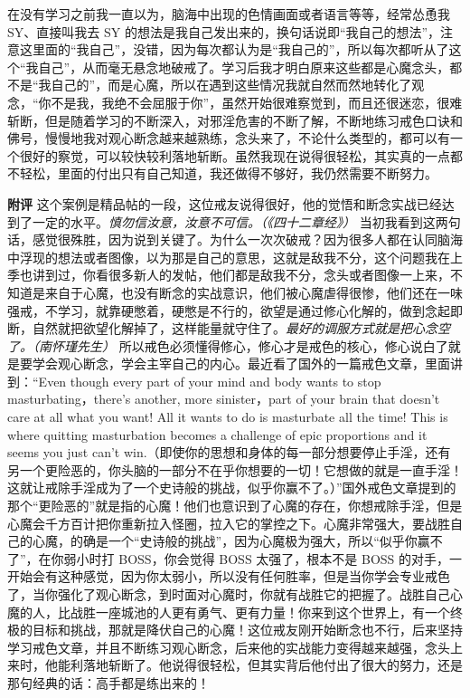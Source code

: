 \begin{case}
    在没有学习之前我一直以为，脑海中出现的色情画面或者语言等等，经常怂恿我 SY、直接叫我去 SY 的想法是我自己发出来的，换句话说即“我自己的想法”，注意这里面的“我自己”，没错，因为每次都认为是“我自己的”，所以每次都听从了这个“我自己”，从而毫无悬念地破戒了。学习后我才明白原来这些都是心魔念头，都不是“我自己的”，而是心魔，所以在遇到这些情况我就自然而然地转化了观念，“你不是我，我绝不会屈服于你”，虽然开始很难察觉到，而且还很迷恋，很难斩断，但是随着学习的不断深入，对邪淫危害的不断了解，不断地练习戒色口诀和佛号，慢慢地我对观心断念越来越熟练，念头来了，不论什么类型的，都可以有一个很好的察觉，可以较快较利落地斩断。虽然我现在说得很轻松，其实真的一点都不轻松，里面的付出只有自己知道，我还做得不够好，我仍然需要不断努力。

    \textbf{附评} 这个案例是精品帖的一段，这位戒友说得很好，他的觉悟和断念实战已经达到了一定的水平。\textit{慎勿信汝意，汝意不可信。（《四十二章经》）} 当初我看到这两句话，感觉很殊胜，因为说到关键了。为什么一次次破戒？因为很多人都在认同脑海中浮现的想法或者图像，以为那是自己的意思，这就是敌我不分，这个问题我在上季也讲到过，你看很多新人的发帖，他们都是敌我不分，念头或者图像一上来，不知道是来自于心魔，也没有断念的实战意识，他们被心魔虐得很惨，他们还在一味强戒，不学习，就靠硬憋着，硬憋是不行的，欲望是通过修心化解的，做到念起即断，自然就把欲望化解掉了，这样能量就守住了。\textit{最好的调服方式就是把心念空了。（南怀瑾先生）} 所以戒色必须懂得修心，修心才是戒色的核心，修心说白了就是要学会观心断念，学会主宰自己的内心。最近看了国外的一篇戒色文章，里面讲到：“Even though every part of your mind and body wants to stop masturbating，there's another, more sinister，part of your brain that doesn't care at all what you want! All it wants to do is masturbate all the time! This is where quitting masturbation becomes a challenge of epic proportions and it seems you just can't win.（即使你的思想和身体的每一部分想要停止手淫，还有另一个更险恶的，你头脑的一部分不在乎你想要的一切！它想做的就是一直手淫！这就让戒除手淫成为了一个史诗般的挑战，似乎你赢不了。）”国外戒色文章提到的那个“更险恶的”就是指的心魔！他们也意识到了心魔的存在，你想戒除手淫，但是心魔会千方百计把你重新拉入怪圈，拉入它的掌控之下。心魔非常强大，要战胜自己的心魔，的确是一个“史诗般的挑战”，因为心魔极为强大，所以“似乎你赢不了”，在你弱小时打 BOSS，你会觉得 BOSS 太强了，根本不是 BOSS 的对手，一开始会有这种感觉，因为你太弱小，所以没有任何胜率，但是当你学会专业戒色了，当你强化了观心断念，到时面对心魔时，你就有战胜它的把握了。战胜自己心魔的人，比战胜一座城池的人更有勇气、更有力量！你来到这个世界上，有一个终极的目标和挑战，那就是降伏自己的心魔！这位戒友刚开始断念也不行，后来坚持学习戒色文章，并且不断练习观心断念，后来他的实战能力变得越来越强，念头上来时，他能利落地斩断了。他说得很轻松，但其实背后他付出了很大的努力，还是那句经典的话：高手都是练出来的！
\end{case}

